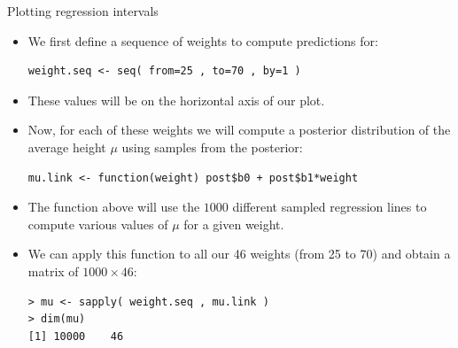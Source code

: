 \documentclass[handout]{beamer}
\begin{document}
\begin{frame}[fragile]{Plotting regression intervals}
\scriptsize{
\begin{itemize}


\item We first define a sequence of weights to compute predictions for:

\begin{verbatim}
weight.seq <- seq( from=25 , to=70 , by=1 ) 
\end{verbatim}

\item These values will be on the horizontal axis of our plot.

\item Now, for each of these weights we will compute a posterior distribution of the average height $\mu$ using samples from the posterior:

\begin{verbatim}
mu.link <- function(weight) post$b0 + post$b1*weight
\end{verbatim}

\item The function above will use the $1000$ different sampled regression lines to compute various values of $\mu$ for a given weight.

\item We can apply this function to all our 46 weights (from 25 to 70) and obtain a matrix of $1000 \times 46$:

\begin{verbatim}
> mu <- sapply( weight.seq , mu.link )
> dim(mu)
[1] 10000    46 
\end{verbatim}



\end{itemize}
 

 
}
\end{frame}
\end{document}
